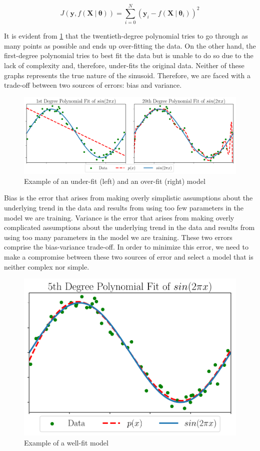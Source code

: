 \begin{equation}
	\label{eq:leastsquares}
	J(\mathbf{y}, f(\mathbf{X} \ | \ \boldsymbol{\theta})) = \sum_{i=0}^{N} (\mathbf{y}_i  - f(\mathbf{X} \ | \ \boldsymbol{\theta}_i))^2
\end{equation}


It is evident from \cref{fig:overfit} that the twentieth-degree polynomial tries to go through as many points as possible and ends up over-fitting the data. On the other hand, the first-degree polynomial tries to best fit the data but is unable to do so due to the lack of complexity and, therefore, under-fits the original data. Neither of these graphs represents the true nature of the sinusoid. Therefore, we are faced with a trade-off between two sources of errors: bias and variance. 

\begin{figure}[!ht]
	\centering
	\includegraphics[width=\linewidth]{pictures/poly_fit.pdf}
	\caption[Example of an under-fit and an over-fit model]{Example of an under-fit (left) and an over-fit (right) model}\label{fig:overfit}  
\end{figure}

Bias is the error that arises from making overly simplistic assumptions about the underlying trend in the data and results from using too few parameters in the model we are training. Variance is the error that arises from making overly complicated assumptions about the underlying trend in the data and results from using too many parameters in the model we are training. These two errors comprise the bias-variance trade-off. In order to minimize this error, we need to make a compromise between these two sources of error and select a model that is neither complex nor simple.

\begin{figure}[!ht]
	\centering
	\includegraphics[width=0.5\linewidth]{pictures/poly_fit_correct.pdf}
	\caption{Example of a well-fit model}\label{fig:wellfit}  
\end{figure}


